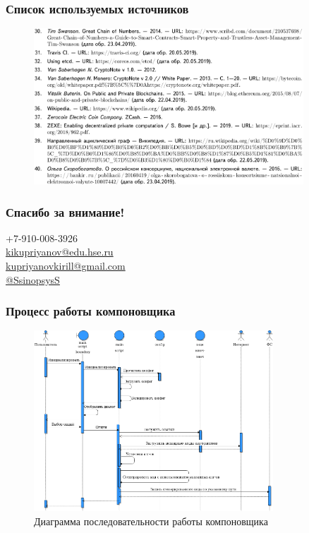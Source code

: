 \documentclass{beamer}
\begin{document}
\begin{frame}
    \frametitle{Список используемых источников}
    \begin{figure}
        \centering
        \includegraphics[width=0.9\textwidth]{lib3}
    \end{figure}
\end{frame}

\begin{frame}[c]
\begin{center}
\frametitle{\LARGE Спасибо за внимание!}

{\LARGE \inserttitle}

\bigskip

{\insertauthor}

\bigskip\bigskip

{\scriptsize \color{HSEblue}
    +7-910-008-3926\\
    \href{mailto:kikupriyanov@edu.hse.ru}{kikupriyanov@edu.hse.ru}\\
    \href{mailto:kupriyanovkirill@gmail.com}{kupriyanovkirill@gmail.com}\\
    \href{https://t.me/SsinopsysS}{@SsinopsysS}}

\bigskip\bigskip

{\large \insertdate}
\end{center}
\end{frame}

\begin{frame}
    \frametitle{Процесс работы компоновщика}
    \begin{figure}
        \centering
        \includegraphics[width=0.8\textwidth]{sequence}
        \caption{\small Диаграмма последовательности работы компоновщика}
    \end{figure}
\end{frame}
\end{document}

